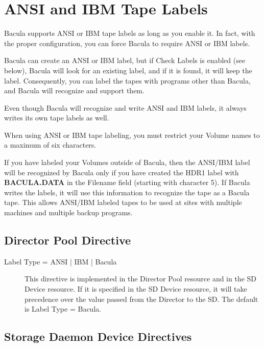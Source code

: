 
\chapter{ANSI and IBM Tape Labels}
\label{AnsiLabelsChapter}

Bacula supports ANSI or IBM tape labels as long as you
enable it.  In fact, with the proper configuration, you can
force Bacula to require ANSI or IBM labels.

Bacula can create an ANSI or IBM label, but if Check Labels is
enabled (see below), Bacula will look for an existing label, and
if it is found, it will keep the label. Consequently, you
can label the tapes with programs other than Bacula, and Bacula
will recognize and support them.

Even though Bacula will recognize and write ANSI and IBM labels, 
it always writes its own tape labels as well.

When using ANSI or IBM tape labeling, you must restrict your Volume
names to a maximum of six characters.  

If you have labeled your Volumes outside of Bacula, then the
ANSI/IBM label will be recognized by Bacula only if you have created
the HDR1 label with {\bf BACULA.DATA} in the Filename field (starting
with character 5).  If Bacula writes the labels, it will use
this information to recognize the tape as a Bacula tape.  This allows
ANSI/IBM labeled tapes to be used at sites with multiple machines
and multiple backup programs.


\section{Director Pool Directive}

\begin{description}
\item [ Label Type = ANSI | IBM | Bacula]  
  This directive is implemented in the Director Pool resource and in the SD Device
  resource.  If it is specified in the SD Device resource, it will take
  precedence over the value passed from the Director to the SD. The default
  is Label Type = Bacula.
\end{description}

\section{Storage Daemon Device Directives}

